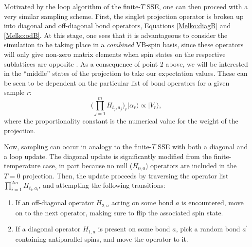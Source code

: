 \documentclass[vecphys]{svmult}
\begin{document}
Motivated by the loop algorithm of the finite-$T$ SSE, one can then proceed with a very similar sampling scheme.  First, the singlet projection operator is broken up into diagonal and off-diagonal bond operators, Equations \ref{Melko:diagB} and \ref{Melko:odB}.
At this stage, one sees that it is advantageous to consider the simulation to be taking place in a {\em combined} VB-spin basis, since these operators will only give non-zero matrix elements when spin states on the respective sublattices are opposite \cite{Melko:Sandvik10a}.  
As a consequence of point 2 above, we will be interested in the ``middle'' states of the projection to take our expectation values.  
These can be seen to be dependent on the particular list of bond operators for a given sample $r$: 
\begin{equation}
\big( \prod_{j=1}^{m} {H_{t_j,a_j}} \big)_r | \alpha_r \rangle \propto |V_r \rangle, \label{Melko:midV}
\end{equation}
where the proportionality constant is the numerical value for the weight of the projection.

Now, sampling can occur in analogy to the finite-$T$ SSE with both a diagonal and a loop update.
The diagonal update is significantly modified from the finite-temperature case, in part because no null ($H_{0,0}$) operators are included in the $T=0$ projection.  Then, the update proceeds by traversing the operator list $\prod_{i=1}^{2m} {H_{t_i,a_i}}$, and attempting the following transitions:
\begin{enumerate}
\item If an off-diagonal operator $H_{2,a}$ acting on some bond $a$ is encountered, move on to the next operator, making sure to flip the associated spin state.
\item If a diagonal operator $H_{1,a}$ is present on some bond $a$, pick a random bond $a^\prime$ containing antiparallel spins, and move the operator to it.
\end{enumerate}
\end{document}
